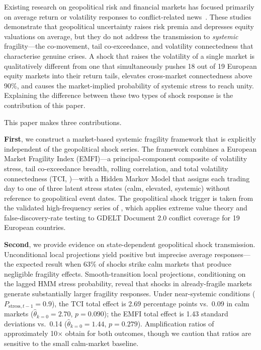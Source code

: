 \documentclass[11pt]{article}
\begin{document}
Existing research on geopolitical risk and financial markets has focused
primarily on average return or volatility responses to conflict-related
news~\citep{caldara2022measuring,berkman2011war,glick2009war}.
These studies demonstrate that geopolitical uncertainty raises risk premia and
depresses equity valuations on average, but they do not address the
transmission to \emph{systemic} fragility---the co-movement, tail
co-exceedance, and volatility connectedness that characterise genuine crises.
A shock that raises the volatility of a single market is qualitatively
different from one that simultaneously pushes 18 out of 19 European equity
markets into their return tails, elevates cross-market connectedness above
90\%, and causes the market-implied probability of systemic stress to reach
unity. Explaining the difference between these two types of shock response is
the contribution of this paper.

This paper makes three contributions.

\textbf{First}, we construct a market-based systemic fragility framework
that is explicitly independent of the geopolitical shock series.
The framework combines a European Market Fragility Index (EMFI)---a
principal-component composite of volatility stress, tail co-exceedance
breadth, rolling correlation, and total volatility connectedness (TCI,
\citealt{dieboldyilmaz2012})---with a Hidden Markov Model that assigns each
trading day to one of three latent stress states (calm, elevated, systemic)
without reference to geopolitical event dates.
The geopolitical shock trigger is taken from the validated high-frequency
series of \citet{lupu2026bir}, which applies extreme value theory and
false-discovery-rate testing to GDELT Document 2.0 conflict coverage for
19 European countries.

\textbf{Second}, we provide evidence on state-dependent geopolitical shock
transmission. Unconditional local projections yield positive but imprecise
average responses---the expected result when 63\% of shocks strike calm
markets that produce negligible fragility effects. Smooth-transition local
projections, conditioning on the lagged HMM stress probability, reveal that
shocks in already-fragile markets generate substantially larger fragility
responses. Under near-systemic conditions ($P_{\mathrm{stress},t-1} = 0.9$),
the TCI total effect is 2.69 percentage points vs.\ 0.09 in calm markets
($\hat\theta_{k=0} = 2.70$, $p = 0.090$); the EMFI total effect is
1.43 standard deviations vs.\ 0.14 ($\hat\theta_{k=0} = 1.44$, $p = 0.279$).
Amplification ratios of approximately 10$\times$ obtain for both outcomes,
though we caution that ratios are sensitive to the small calm-market baseline.
\end{document}
